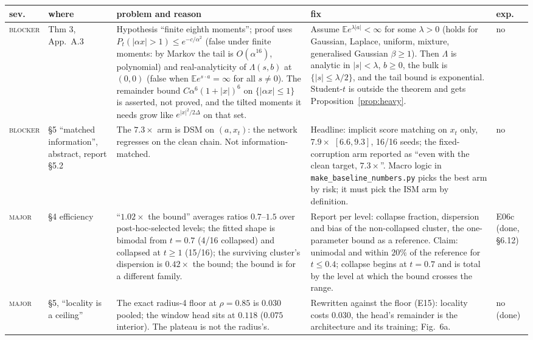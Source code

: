 \documentclass[11pt,a4paper]{article}
\newcommand{\sev}[1]{\textsc{#1}}
\newcommand{\E}{\mathbb{E}}
\theoremstyle{definition}
\theoremstyle{remark}
\begin{document}
{\setlength{\tabcolsep}{3pt}\small
\begin{longtable}{@{}>{\raggedright\arraybackslash}p{1.75cm}>{\raggedright\arraybackslash}p{2.0cm}>{\raggedright\arraybackslash}p{6.05cm}>{\raggedright\arraybackslash}p{4.3cm}>{\raggedright\arraybackslash}p{0.9cm}@{}}
\toprule
sev. & where & problem and reason & fix & exp. \\
\midrule
\endhead
\sev{blocker} & Thm 3, App.\ A.3 & Hypothesis ``finite eighth moments''; proof uses $P_t(|\alpha x|>1)\le e^{-c/\alpha^2}$ (false under finite moments: by Markov the tail is $O(\alpha^{16})$, polynomial) and real-analyticity of $\Lambda(s,b)$ at $(0,0)$ (false when $\E e^{s\cdot a}=\infty$ for all $s\ne0$). The remainder bound $C\alpha^6(1+|x|)^6$ on $\{|\alpha x|\le1\}$ is asserted, not proved, and the tilted moments it needs grow like $e^{|x|^2/2\Delta}$ on that set. & Assume $\E e^{\lambda|a|}<\infty$ for some $\lambda>0$ (holds for Gaussian, Laplace, uniform, mixture, generalised Gaussian $\beta\ge1$). Then $\Lambda$ is analytic in $|s|<\lambda$, $b\ge0$, the bulk is $\{|s|\le\lambda/2\}$, and the tail bound is exponential. Student-$t$ is outside the theorem and gets Proposition~\ref{prop:heavy}. & no \\
\sev{blocker} & \S5 ``matched information'', abstract, report \S5.2 & The $7.3\times$ arm is DSM on $(a,x_t)$: the network regresses on the clean chain. Not information-matched. & Headline: implicit score matching on $x_t$ only, $7.9\times$ $[6.6,9.3]$, 16/16 seeds; the fixed-corruption arm reported as ``even with the clean target, $7.3\times$''. Macro logic in \texttt{make\_baseline\_numbers.py} picks the best arm by risk; it must pick the ISM arm by definition. & no \\
\sev{major} & \S4 efficiency & ``$1.02\times$ the bound'' averages ratios $0.7$--$1.5$ over post-hoc-selected levels; the fitted shape is bimodal from $t=0.7$ (4/16 collapsed) and collapsed at $t\ge1$ (15/16); the surviving cluster's dispersion is $0.42\times$ the bound; the bound is for a different family. & Report per level: collapse fraction, dispersion and bias of the non-collapsed cluster, the one-parameter bound as a reference. Claim: unimodal and within $20\%$ of the reference for $t\le0.4$; collapse begins at $t=0.7$ and is total by the level at which the bound crosses the range. & E06c (done, \S6.12) \\
\sev{major} & \S5, ``locality is a ceiling'' & The exact radius-4 floor at $\rho=0.85$ is $0.030$ pooled; the window head sits at $0.118$ ($0.075$ interior). The plateau is not the radius's. & Rewritten against the floor (E15): locality costs $0.030$, the head's remainder is the architecture and its training; Fig.~6a. & no (done) \\

\end{longtable}}
\end{document}
